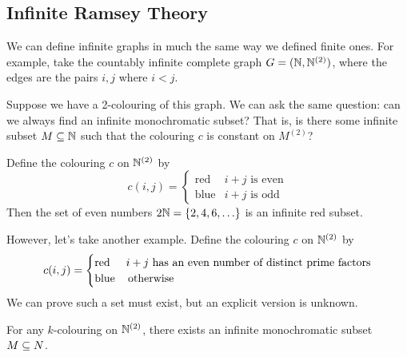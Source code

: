 \documentclass{article}
\begin{document}

\subsection{Infinite Ramsey Theory}

We can define infinite graphs in much the same way we defined finite ones. For example, take the countably infinite complete graph $G = (\mathbb{N}, \mathbb{N}^{(2)})$, where the edges are the pairs $i, j$ where $i < j$.

Suppose we have a 2-colouring of this graph. We can ask the same question: can we always find an infinite monochromatic subset? That is, is there some infinite subset $M \subseteq \mathbb{N}$ such that the colouring $c$ is constant on $M^{(2)}$?

\begin{example}
    Define the colouring $c$ on $\mathbb{N}^{(2)}$ by
    \[
	c(i, j) = \begin{cases}
		\text{red} & \text{$i+j$ is even} \\
		\text{blue} & \text{$i+j$ is odd}
	\end{cases}
\]
Then the set of even numbers $2\N = \set{2, 4, 6, \dots }$ is an infinite red subset.

However, let's take another example. Define the colouring $c$ on $\mathbb{N}^{(2)}$ by
    \[
	c(i, j) = \begin{cases}
		\text{red} & \text{$i+j$ has an even number of distinct prime factors} \\
		\text{blue} & \mathrel{\, \text{otherwise}}
	\end{cases}
\]
We can prove such a set must exist, but an explicit version is unknown.
\end{example}

\begin{theorem}
    \label{infinite-ramseys-theorem}
    For any $k$-colouring on $\mathbb{N}^{(2)}$, there exists an infinite monochromatic subset $M \subseteq N$.
\end{theorem}
\end{document}
